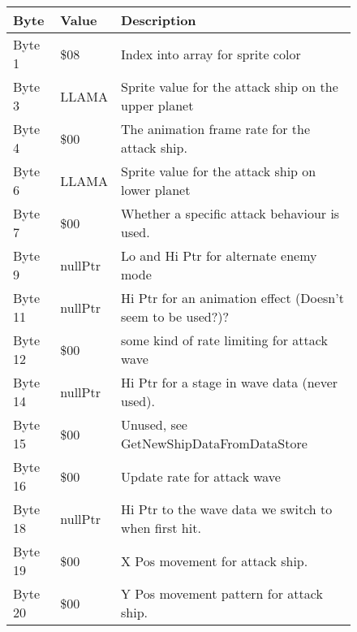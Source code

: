 \begin{figure}[H]
  {
  \setlength{\tabcolsep}{3.0pt}
  \setlength\cmidrulewidth{\heavyrulewidth} %
  \begin{adjustbox}{width=12cm}

\begin{tabular}{lll}
\toprule
 Byte    & Value                      & Description                                                        \\
\midrule
 Byte 1  & \$08                        & Index into array for sprite color                                  \\
 Byte 3  & LLAMA                      & Sprite value for the attack ship on the upper planet               \\
 Byte 4  & \$00                        & The animation frame rate for the attack ship.                      \\
 Byte 6  & LLAMA                      & Sprite value for the attack ship on lower planet                   \\
 Byte 7  & \$00                        & Whether a specific attack behaviour is used.                       \\
 Byte 9  & nullPtr                    & Lo and Hi Ptr for alternate enemy mode                             \\
 Byte 11 & nullPtr                    & Hi Ptr for an animation effect (Doesn't seem to be used?)?         \\
 Byte 12 & \$00                        & some kind of rate limiting for attack wave                         \\
 Byte 14 & nullPtr                    & Hi Ptr for a stage in wave data (never used).                      \\
 Byte 15 & \$00                        & Unused, see GetNewShipDataFromDataStore                            \\
 Byte 16 & \$00                        & Update rate for attack wave                                        \\
 Byte 18 & nullPtr                    & Hi Ptr to the wave data we switch to when first hit.               \\
 Byte 19 & \$00                        & X Pos movement for attack ship.                                    \\
 Byte 20 & \$00                        & Y Pos movement pattern for attack ship.                            \\

\end{tabular}
\end{adjustbox}}
\end{figure}
